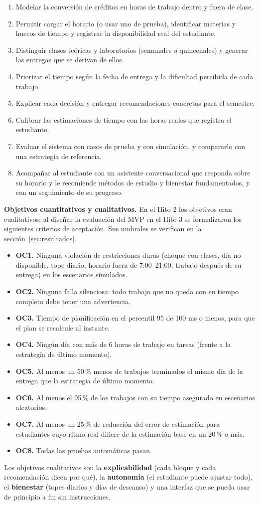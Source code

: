 \begin{enumerate}
    \item Modelar la conversión de créditos en horas de trabajo dentro y fuera de clase.
    \item Permitir cargar el horario (o usar uno de prueba), identificar materias y huecos de tiempo y registrar la disponibilidad real del estudiante.
    \item Distinguir clases teóricas y laboratorios (semanales o quincenales) y generar las entregas que se derivan de ellos.
    \item Priorizar el tiempo según la fecha de entrega y la dificultad percibida de cada trabajo.
    \item Explicar cada decisión y entregar recomendaciones concretas para el semestre.
    \item Calibrar las estimaciones de tiempo con las horas reales que registra el estudiante.
    \item Evaluar el sistema con casos de prueba y con simulación, y compararlo con una estrategia de referencia.
    \item Acompañar al estudiante con un asistente conversacional que responda sobre su horario y le recomiende métodos de estudio y bienestar fundamentados, y con un seguimiento de su progreso.
\end{enumerate}

\textbf{Objetivos cuantitativos y cualitativos.} En el Hito 2 los objetivos eran cualitativos; al diseñar la evaluación del MVP en el Hito 3 se formalizaron los siguientes criterios de aceptación. Sus umbrales se verifican en la sección~\ref{sec:resultados}.

\begin{itemize}
    \item \textbf{OC1.} Ninguna violación de restricciones duras (choque con clases, día no disponible, tope diario, horario fuera de 7:00--21:00, trabajo después de su entrega) en los escenarios simulados.
    \item \textbf{OC2.} Ninguna falla silenciosa: todo trabajo que no queda con su tiempo completo debe tener una advertencia.
    \item \textbf{OC3.} Tiempo de planificación en el percentil 95 de 100 ms o menos, para que el plan se recalcule al instante.
    \item \textbf{OC4.} Ningún día con más de 6 horas de trabajo en tareas (frente a la estrategia de último momento).
    \item \textbf{OC5.} Al menos un 50\,\% menos de trabajos terminados el mismo día de la entrega que la estrategia de último momento.
    \item \textbf{OC6.} Al menos el 95\,\% de los trabajos con su tiempo asegurado en escenarios aleatorios.
    \item \textbf{OC7.} Al menos un 25\,\% de reducción del error de estimación para estudiantes cuyo ritmo real difiere de la estimación base en un 20\,\% o más.
    \item \textbf{OC8.} Todas las pruebas automáticas pasan.
\end{itemize}

Los objetivos cualitativos son la \textbf{explicabilidad} (cada bloque y cada recomendación dicen por qué), la \textbf{autonomía} (el estudiante puede ajustar todo), el \textbf{bienestar} (topes diarios y días de descanso) y una interfaz que se pueda usar de principio a fin sin instrucciones.
